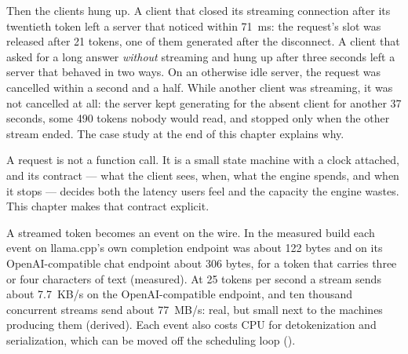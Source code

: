 Then the clients hung up. A client that closed its streaming connection after
its twentieth token left a server that noticed within 71~ms: the request's slot
was released after 21 tokens, one of them generated after the disconnect. A
client that asked for a long answer \emph{without} streaming and hung up after
three seconds left a server that behaved in two ways. On an otherwise idle
server, the request was cancelled within a second and a half. While another
client was streaming, it was not cancelled at all: the server kept generating
for the absent client for another 37 seconds, some 490 tokens nobody would
read, and stopped only when the other stream ended. The case study at the end
of this chapter explains why.

A request is not a function call. It is a small state machine with a clock
attached, and its contract --- what the client sees, when, what the engine
spends, and when it stops --- decides both the latency users feel and the
capacity the engine wastes. This chapter makes that contract explicit.



A streamed token becomes an event on the wire. In the measured build each
event on llama.cpp's own completion endpoint was about 122 bytes and on its
OpenAI-compatible chat endpoint about 306 bytes, for a token that carries three
or four characters of text (measured). At 25 tokens per second a stream sends
about 7.7~KB/s on the OpenAI-compatible endpoint, and ten thousand concurrent
streams send about 77~MB/s: real, but small next to the machines producing
them (derived). Each event also costs CPU for detokenization and
serialization, which can be moved off the scheduling loop
().

